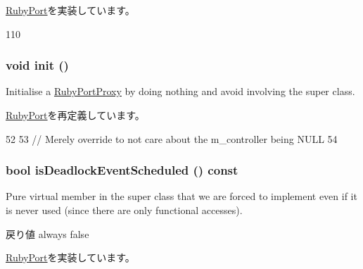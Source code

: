 \hyperlink{classRubyPort_ae635736b1bd64144a8f1fc5f42948b21}{RubyPort}を実装しています。


\begin{DoxyCode}
110 { }
\end{DoxyCode}
\hypertarget{classRubyPortProxy_a02fd73d861ef2e4aabb38c0c9ff82947}{
\subsubsection[{init}]{\setlength{\rightskip}{0pt plus 5cm}void init ()}}
\label{classRubyPortProxy_a02fd73d861ef2e4aabb38c0c9ff82947}
Initialise a \hyperlink{classRubyPortProxy}{RubyPortProxy} by doing nothing and avoid involving the super class. 

\hyperlink{classRubyPort_a02fd73d861ef2e4aabb38c0c9ff82947}{RubyPort}を再定義しています。


\begin{DoxyCode}
52 {
53     // Merely override to not care about the m_controller being NULL
54 }
\end{DoxyCode}
\hypertarget{classRubyPortProxy_a11ce018fbd3aa89624b06dbdafbd4ef9}{
\subsubsection[{isDeadlockEventScheduled}]{\setlength{\rightskip}{0pt plus 5cm}bool isDeadlockEventScheduled () const}}
\label{classRubyPortProxy_a11ce018fbd3aa89624b06dbdafbd4ef9}
Pure virtual member in the super class that we are forced to implement even if it is never used (since there are only functional accesses).

\begin{DoxyReturn}{戻り値}
always false 
\end{DoxyReturn}


\hyperlink{classRubyPort_a24d37c70faaaf126b544c2d46ea70ce2}{RubyPort}を実装しています。


